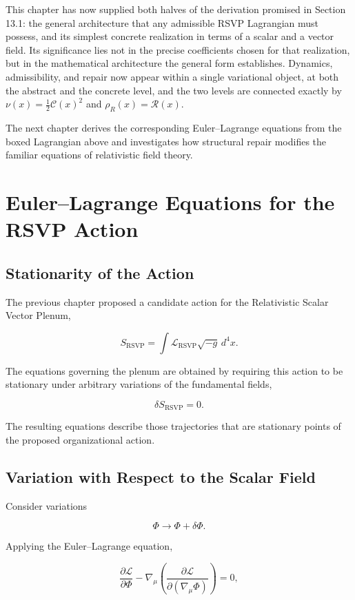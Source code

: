 \documentclass[11pt,oneside]{book}
\numberwithin{equation}{chapter}
\theoremstyle{definition}
\theoremstyle{plain}
\begin{document}
This chapter has now supplied both halves of the derivation promised in
Section 13.1: the general architecture that any admissible RSVP Lagrangian
must possess, and its simplest concrete realization in terms of a scalar and
a vector field. Its significance lies not in the precise coefficients
chosen for that realization, but in the mathematical architecture the
general form establishes. Dynamics, admissibility, and repair now appear
within a single variational object, at both the abstract and the concrete
level, and the two levels are connected exactly by \(\nu(x)=\tfrac12\mathcal
C(x)^2\) and \(\rho_R(x)=\mathcal R(x)\).

The next chapter derives the corresponding Euler--Lagrange equations from
the boxed Lagrangian above and investigates how structural repair modifies
the familiar equations of relativistic field theory.

\chapter{Euler--Lagrange Equations for the RSVP Action}

\section{Stationarity of the Action}

The previous chapter proposed a candidate action for the Relativistic Scalar
Vector Plenum,

\[
S_{\mathrm{RSVP}}
=
\int
\mathcal L_{\mathrm{RSVP}}
\sqrt{-g}\,d^4x.
\]

The equations governing the plenum are obtained by requiring this action to
be stationary under arbitrary variations of the fundamental fields,

\[
\delta S_{\mathrm{RSVP}}=0.
\]

The resulting equations describe those trajectories that are stationary
points of the proposed organizational action.

\section{Variation with Respect to the Scalar Field}

Consider variations

\[
\Phi
\rightarrow
\Phi+\delta\Phi.
\]

Applying the Euler--Lagrange equation,

\[
\frac{\partial\mathcal L}{\partial\Phi}
-
\nabla_\mu
\left(
\frac{\partial\mathcal L}
{\partial(\nabla_\mu\Phi)}
\right)
=0,
\]
\end{document}
